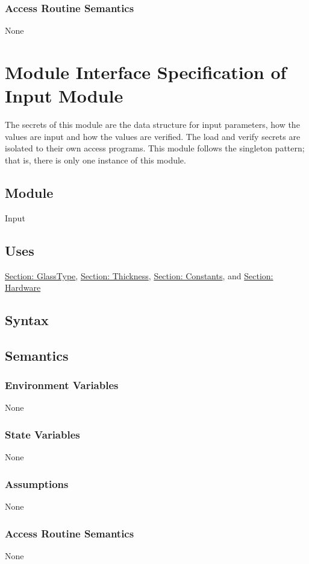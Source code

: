 \documentclass[12pt]{article}
\begin{document}
\subsubsection{Access Routine Semantics}
\label{Sec:AccRoutSemantics}
None
\section{Module Interface Specification of Input Module}
\label{Sec:Input}
The secrets of this module are the data structure for input parameters, how the values are input and how the values are verified. The load and verify secrets are isolated to their own access programs. This module follows the singleton pattern; that is, there is only one instance of this module.
\subsection{Module}
\label{Sec:Module}
Input
\subsection{Uses}
\label{Sec:Uses}
\hyperref[Sec:GlassTypeADT]{Section: GlassType}, \hyperref[Sec:ThicknessADT]{Section: Thickness}, \hyperref[Sec:ConstantsADT]{Section: Constants}, and \hyperref[Sec:HardwareADT]{Section: Hardware}
\subsection{Syntax}
\label{Sec:Syntax}
\subsection{Semantics}
\label{Sec:Semantics}
\subsubsection{Environment Variables}
\label{Sec:EnviroVars}
None
\subsubsection{State Variables}
\label{Sec:StateVars}
None
\subsubsection{Assumptions}
\label{Sec:Assumps}
None
\subsubsection{Access Routine Semantics}
\label{Sec:AccRoutSemantics}
None
\end{document}
